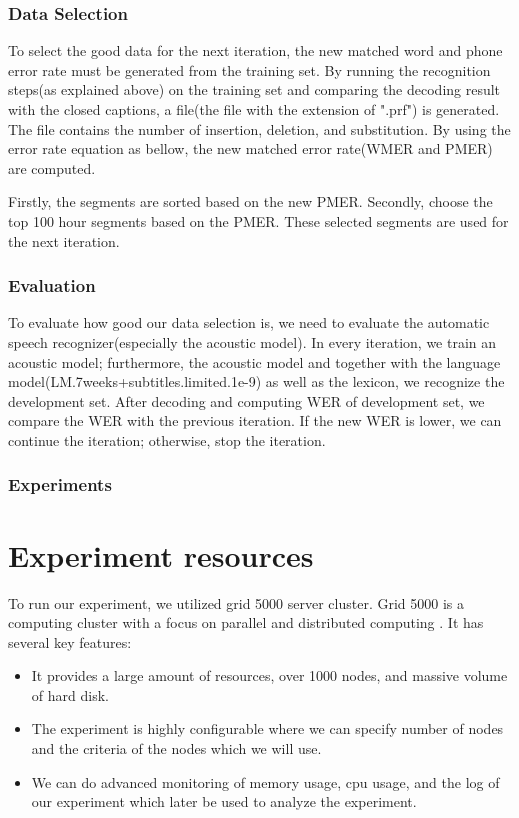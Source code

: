 \subsubsection{Data Selection}
To select the good data for the next iteration, the new matched word and phone error rate must be generated from the training set. By running the recognition steps(as explained above) on the training set and comparing the decoding result with the closed captions, a file(the file with the extension of ".prf") is generated. The file contains the number of insertion, deletion, and substitution. By using the error rate equation as bellow, the new matched error rate(WMER and PMER) are computed. 

Firstly, the segments are sorted based on the new PMER. Secondly, choose the top 100 hour segments based on the PMER. These selected segments are used for the next iteration. 

\subsubsection{Evaluation}
To evaluate how good our data selection is, we need to evaluate the automatic speech recognizer(especially the acoustic model). In every iteration, we train an acoustic model; furthermore, the acoustic model and together with the language model(LM.7weeks+subtitles.limited.1e-9) as well as the lexicon, we recognize the development set. After decoding and computing WER of development set, we compare the WER with the previous iteration. If the new WER is lower, we can continue the iteration; otherwise, stop the iteration. 

\subsubsection{Experiments}

\section{Experiment resources}
To run our experiment, we utilized grid 5000 server cluster. Grid 5000 is a computing cluster with a focus on parallel and distributed computing \cite{Grid5000}. It has several key features:
\begin{itemize}
\item It provides a large amount of resources, over 1000 nodes, and massive volume of hard disk.
\item The experiment is highly configurable where we can specify number of nodes and the criteria of the nodes which we will use.
\item We can do advanced monitoring of memory usage, cpu usage, and the log of our experiment which later be used to analyze the experiment.
\end{itemize}

